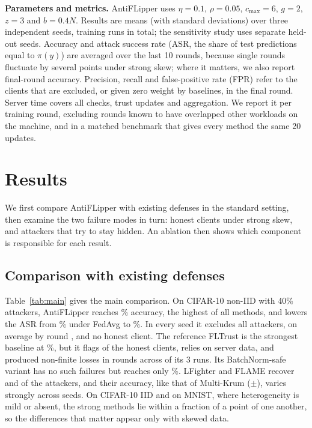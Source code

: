 \documentclass[conference]{IEEEtran}
\begin{document}
\textbf{Parameters and metrics.} AntiFLipper uses $\eta{=}0.1$, $\rho{=}0.05$, $c_{\max}{=}6$, $g{=}2$, $z{=}3$ and $b{=}0.4N$. Results are means (with standard deviations) over three independent seeds, \nRuns{} training runs in total; the sensitivity study uses separate held-out seeds. Accuracy and attack success rate (ASR, the share of test predictions equal to $\pi(y)$) are averaged over the last 10 rounds, because single rounds fluctuate by several points under strong skew; where it matters, we also report final-round accuracy. Precision, recall and false-positive rate (FPR) refer to the clients that are excluded, or given zero weight by baselines, in the final round. Server time covers all checks, trust updates and aggregation. We report it per training round, excluding rounds known to have overlapped other workloads on the machine, and in a matched benchmark that gives every method the same 20 updates.

\section{Results}
\label{sec:results}
We first compare AntiFLipper with existing defenses in the standard setting, then examine the two failure modes in turn: honest clients under strong skew, and attackers that try to stay hidden. An ablation then shows which component is responsible for each result.




\subsection{Comparison with existing defenses}
Table~\ref{tab:main} gives the main comparison. On CIFAR-10 non-IID with 40\% attackers, AntiFLipper reaches \headAcc\% accuracy, the highest of all methods, and lowers the ASR from \headASRFedAvg\% under FedAvg to \headASR\%. In every seed it excludes all attackers, on average by round \headDet, and no honest client. The reference FLTrust is the strongest baseline at \headAccFLTrust\%, but it flags \headFPRFLTrust{} of the honest clients, relies on server data, and produced non-finite losses in \fltrustNanRounds{} rounds across \fltrustNanRuns{} of its 3 runs. Its BatchNorm-safe variant has no such failures but reaches only \bnsafeHead\%. LFighter and FLAME recover \headRecallLFighter{} and \headRecallFLAME{} of the attackers, and their accuracy, like that of Multi-Krum ($\pm$\headAccKrumStd), varies strongly across seeds. On CIFAR-10 IID and on MNIST, where heterogeneity is mild or absent, the strong methods lie within a fraction of a point of one another, so the differences that matter appear only with skewed data.
\end{document}
